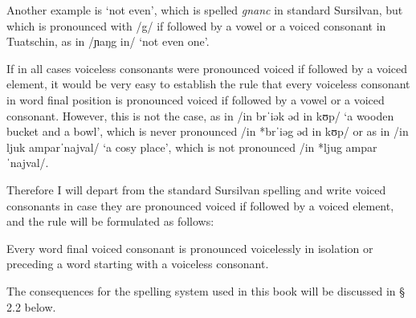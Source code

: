 Another example is `not even', which is spelled \textit{gnanc} in standard Sursilvan, but which is pronounced with /g/ if followed by a vowel or a voiced consonant in Tuatschin, as in /ɲaŋg in/ `not even one'.

If in all cases voiceless consonants were pronounced voiced if followed by a voiced element, it would be very easy to establish the rule that every voiceless consonant in word final position is pronounced voiced if followed by a vowel or a voiced consonant. However, this is not the case, as in /in brˈiək əd in kʊp/ `a wooden bucket and a bowl', which is never pronounced /in *brˈiəg əd in kʊp/ or as in /in ljuk amparˈnajval/ `a cosy place', which is not pronounced /in *ljug amparˈnajval/.

Therefore I will depart from the standard Sursilvan spelling and write voiced consonants in case they are pronounced voiced if followed by a voiced element, and the rule will be formulated as follows:

Every word final voiced consonant is pronounced voicelessly in isolation or preceding a word starting with a voiceless consonant.

The consequences for the spelling system used in this book will be discussed in § 2.2 below.

